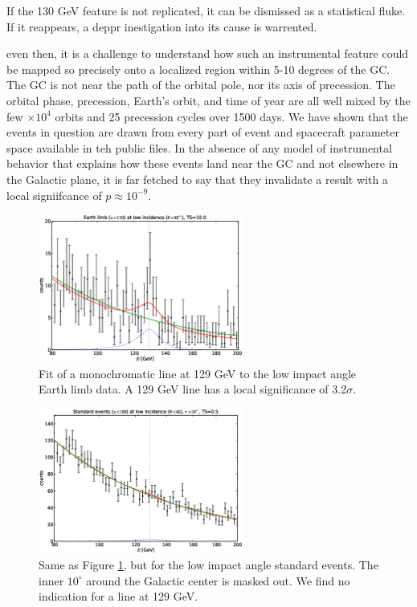 \documentclass[aps,twocolumn,prd,superscriptaddress,showpacs,nofootinbib,fixfloat]{revtex4}
\begin{document}
If the 130 GeV feature is not replicated, it can be dismissed as a statistical
fluke.  If it reappears, a deppr inestigation into its cause is warrented.  

even then, it is a challenge to understand how such an instrumental feature
could be mapped so precisely onto a localized region within 5-10 degrees of
the GC.  The GC is not near the path of the orbital pole, nor its axis of
precession.  The orbital phase, precession, Earth's orbit, and time of year
are all well mixed by the few $\times10^4$ orbits and 25 precession cycles
over 1500 days.  We have shown that the events in question are drawn from
every part of event and spacecraft parameter space available in teh public
files.  In the absence of any model of instrumental behavior that explains how
these events land near the GC and not elsewhere in the Galactic plane, it is
far fetched to say that they invalidate a result with a local signiifcance of
$p\approx10^{-9}$.  



\begin{figure}[p]
\centering
\includegraphics[width=0.6\textwidth]{plots/albedo_line_thetaCut.eps}
\caption{Fit of a monochromatic line at 129 GeV to the low impact angle Earth
  limb data. A 129 GeV line has a local significance of 3.2$\sigma$.
}
\label{fig:albedoline}
\end{figure}

\begin{figure}[p]
\centering
\includegraphics[width=0.6\textwidth]{plots/noalbedo_line_thetaCut.eps}
\caption{Same as Figure \ref{fig:albedoline}, but for the low
impact angle standard events. The inner $10^\circ$ around the Galactic center
is masked out. We find no indication for a line at 129 GeV.
}
\label{fig:noalbedoline}
\end{figure}
\end{document}
